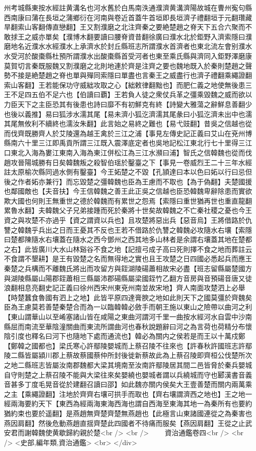 州考城縣東按水經註黄溝名也河水舊於白馬南泆通濮濟黄溝濟陽故城在曹州寃句縣西南康曰蒲在長垣之蒲鄉衍在河南與卷近首蓋牛首垣即長垣濟子禮翻垣于元翻瓚藏旱翻索山客翻傳直戀翻】王又割濮磨之北注齊秦之要絶楚趙之脊天下五合六聚而不敢捄王之威亦單矣【濮博木翻要讀曰腰脊資昔翻徐廣曰濮水北於鉅野入濟索隱曰濮磨地名近濮水水經濮水上承濟水於封丘縣班志所謂濮水首濟者也東北流左會别濮水水受河於酸棗縣杜預所謂濮水出酸棗縣首受河者也東至乘氏縣與濟同入鉅野澤磨康莫賀切言秦既服魏又割濮磨之北則地連於齊是注齊之要也魏地既入於秦則楚趙之聲勢不接是絶楚趙之脊也單與殫同索隱曰單盡也言秦王之威盡行也濟子禮翻乘繩證翻索山客翻】王若能保功守威絀攻取之心【絀敕律翻黜也】而肥仁義之地使無後患三王不足四五伯不足六也【伯讀曰覇】王若負人徒之衆仗兵革之彊乘毀魏之威而欲以力臣天下之主臣恐其有後患也詩曰靡不有初鮮克有終【詩變大雅蕩之辭鮮息善翻少也後以義推】易曰狐涉水濡其尾【易未濟小狐汔濟濡其尾彖曰小狐汔濟未出中也濡其尾無攸利不續終也濡汝朱翻】此言始之易終之難也【易弋豉翻】昔吳之信越也從而伐齊既勝齊人於艾陵還為越王禽於三江之浦【事見左傳史記正義曰艾山在兗州博縣南六十里三江即禹貢所謂三江既入震澤底定者也吳地記松江東北行七十里得三江口東北入海為婁江東南入海為東江併松江為三江水瀕曰浦】智氏之信韓魏也從而伐趙攻晉陽城勝有日矣韓魏叛之殺智伯瑶於鑿臺之下【事見一卷威烈王二十三年水經註太原榆次縣同過水側有鑿臺】今王妬楚之不毀【孔頴達曰本以色曰妬以行曰忌但後之作者妬亦兼行】而忘毀楚之彊韓魏也臣為王慮而不取也【為于偽翻】夫楚國援也鄰國敵也【夫音扶】今王信韓魏之善王此正吳之信越也臣恐韓魏卑辭除患而實欲欺大國也何則王無重世之德於韓魏而有累世之怨焉【索隱曰重世猶再世也重直龍翻累魯水翻】夫韓魏父子兄弟接踵而死於秦將十世矣故韓魏之不亡秦社稷之憂也今王資之與攻楚不亦過乎【資之謂資以兵也】且攻楚將惡出兵【惡音烏】王將借路於仇讐之韓魏乎兵出之日而王憂其不反也王若不借路於仇讐之韓魏必攻隨水右壤【索隱曰楚都陳隨水右壤蓋在隨水之西今鄧州之西其地多山林者是余謂右壤蓋其地在楚都之右】此皆廣川大水山林谿谷不食之地【記擅弓成子高曰死則擇不食之地而葬註云不食謂不墾耕】是王有毀楚之名而無得地之實也且王攻楚之日四國必悉起兵而應王秦楚之兵構而不離魏氏將出而攻留方與銍湖陵碭蕭相故宋必盡【班志留縣屬楚國方與湖陵縣屬山陽郡銍蕭相三縣屬沛郡碭縣屬梁國銍竹乙翻方音房與音預碭音唐又徒浪翻相息亮翻史記正義曰徐州西宋州東兗州南並故宋地】齊人南面攻楚泗上必舉【時楚蠶食魯國有泗上之地】此皆平原四達膏腴之地如此則天下之國莫彊於齊魏矣臣為王慮莫若善楚秦楚合而為一以臨韓韓必斂手而朝王施以東山之險帶以曲河之利【東山謂華山以至崤塞諸山皆在咸陽之東曲河謂河千里一曲按水經河水自雲中沙南縣屈而南流至華陰潼關曲而東流所謂曲河也春秋說題辭曰河之為言荷也荷精分布懷陰引度也釋名曰河下也隨地下處而通流也】韓必為關内之侯若是而王以十萬戍鄭【鄭韓之國都也】梁氏寒心許鄢陵嬰城而上蔡召陵不往來也【許春秋許國班志許鄢陵二縣皆屬潁川郡上蔡故蔡國蔡仲所封後徙新蔡故此為上蔡召陵即齊桓公伐楚所次之地二縣班志皆屬汝南郡魏都大梁其境南至汝南許鄢陵居其間二邑皆脅於秦兵嬰城自守則楚之上蔡召陵不能與大梁往來矣嬰繞也嬰城者謂以兵繞城而守也郾漢書音義音甚多丁度毛晃音從於建翻召讀曰邵】如此魏亦關内侯矣大王壹善楚而關内兩萬乘之主【乘繩證翻】注地於齊齊右壤可拱手而取也【齊右壤謂濟西之地也】王之地一經兩海要約天下【東西為經兩海東海西海也謂自西海至東海其地一為秦所有也要約猶約束也要於遥翻】是燕趙無齊楚齊楚無燕趙也【此極言山東諸國連從之為秦害也燕因肩翻】然後危動燕趙直揺齊楚此四國者不待痛而服矣【燕因肩翻】王從之止武安君而謝韓魏使黄歇歸約親於楚<br />
<br />
　　資治通鑑卷四<br />
<br />
<史部,編年類,資治通鑑>  <br>
   </div> 

